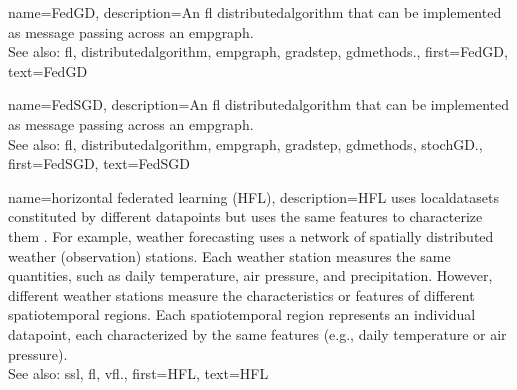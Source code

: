 {name={FedGD},
	description={An \gls{fl} \gls{distributedalgorithm} that 
		can be implemented as message passing across an \gls{empgraph}. 
		\\ 
		See also: \gls{fl}, \gls{distributedalgorithm}, \gls{empgraph}, \gls{gradstep}, \gls{gdmethods}.},
	first={FedGD},
	text={FedGD}
} 

{name={FedSGD},
	description={An \gls{fl} \gls{distributedalgorithm} that 
		can be implemented as message passing across an \gls{empgraph}. 
		\\ 
		See also: \gls{fl}, \gls{distributedalgorithm}, \gls{empgraph}, \gls{gradstep}, \gls{gdmethods}, \gls{stochGD}.},
	first={FedSGD},
	text={FedSGD}
} 

{name={horizontal federated learning (HFL)},
	description={HFL uses \glspl{localdataset} constituted by different
	   	\glspl{datapoint} but uses the same \glspl{feature} to characterize them \cite{HFLChapter2020}.
		For example, weather forecasting uses a network of spatially distributed
		weather (observation) stations. Each weather station measures the
		same quantities, such as daily temperature, air pressure, and precipitation.
		However, different weather stations measure the characteristics or
		\glspl{feature} of different spatiotemporal regions. Each spatiotemporal region 
		represents an individual \gls{datapoint}, each characterized by the same \glspl{feature} 
		(e.g., daily temperature or air pressure).\\
		See also: \gls{ssl}, \gls{fl}, \gls{vfl}.},
	first={HFL},
	text={HFL}
} 

